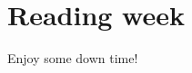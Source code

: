 \documentclass[../main.tex]{subfiles}
\begin{document}
 \section{Reading week}
Enjoy some down time!
\end{document}
